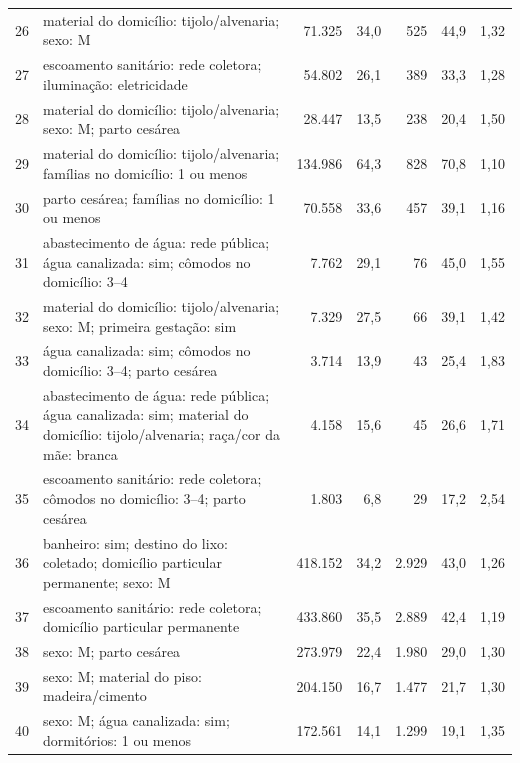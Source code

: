 \begin{table}[H]
\begin{tabularx}{\textwidth}{@{}c Y r r r r r@{}}
26 & material do domicílio: tijolo/alvenaria; sexo: M & 71.325 & 34,0 & 525 & 44,9 & 1,32 \\
27 & escoamento sanitário: rede coletora; iluminação: eletricidade & 54.802 & 26,1 & 389 & 33,3 & 1,28 \\
28 & material do domicílio: tijolo/alvenaria; sexo: M; parto cesárea & 28.447 & 13,5 & 238 & 20,4 & 1,50 \\
29 & material do domicílio: tijolo/alvenaria; famílias no domicílio: 1 ou menos & 134.986 & 64,3 & 828 & 70,8 & 1,10 \\
30 & parto cesárea; famílias no domicílio: 1 ou menos & 70.558 & 33,6 & 457 & 39,1 & 1,16 \\

31 & abastecimento de água: rede pública; água canalizada: sim; cômodos no domicílio: 3--4 & 7.762 & 29,1 & 76 & 45,0 & 1,55 \\
32 & material do domicílio: tijolo/alvenaria; sexo: M; primeira gestação: sim & 7.329 & 27,5 & 66 & 39,1 & 1,42 \\
33 & água canalizada: sim; cômodos no domicílio: 3--4; parto cesárea & 3.714 & 13,9 & 43 & 25,4 & 1,83 \\
34 & abastecimento de água: rede pública; água canalizada: sim; material do domicílio: tijolo/alvenaria; raça/cor da mãe: branca & 4.158 & 15,6 & 45 & 26,6 & 1,71 \\
35 & escoamento sanitário: rede coletora; cômodos no domicílio: 3--4; parto cesárea & 1.803 & 6,8 & 29 & 17,2 & 2,54 \\

36 & banheiro: sim; destino do lixo: coletado; domicílio particular permanente; sexo: M & 418.152 & 34,2 & 2.929 & 43,0 & 1,26 \\
37 & escoamento sanitário: rede coletora; domicílio particular permanente & 433.860 & 35,5 & 2.889 & 42,4 & 1,19 \\
38 & sexo: M; parto cesárea & 273.979 & 22,4 & 1.980 & 29,0 & 1,30 \\
39 & sexo: M; material do piso: madeira/cimento & 204.150 & 16,7 & 1.477 & 21,7 & 1,30 \\
40 & sexo: M; água canalizada: sim; dormitórios: 1 ou menos & 172.561 & 14,1 & 1.299 & 19,1 & 1,35 \\
\bottomrule
\end{tabularx}
\end{table}

